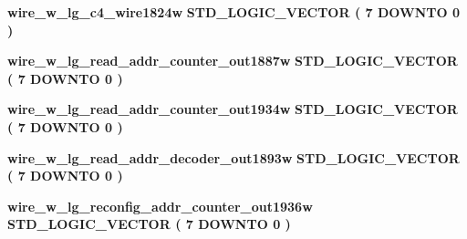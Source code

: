 \begin{DoxyCompactItemize}
\item 
{\bf wire\+\_\+w\+\_\+lg\+\_\+c4\+\_\+wire1824w} {\bfseries \textcolor{comment}{S\+T\+D\+\_\+\+L\+O\+G\+I\+C\+\_\+\+V\+E\+C\+T\+OR}\textcolor{vhdlchar}{ }\textcolor{vhdlchar}{(}\textcolor{vhdlchar}{ }\textcolor{vhdlchar}{ } \textcolor{vhdldigit}{7} \textcolor{vhdlchar}{ }\textcolor{keywordflow}{D\+O\+W\+N\+TO}\textcolor{vhdlchar}{ }\textcolor{vhdlchar}{ } \textcolor{vhdldigit}{0} \textcolor{vhdlchar}{ }\textcolor{vhdlchar}{)}\textcolor{vhdlchar}{ }} 
\item 
{\bf wire\+\_\+w\+\_\+lg\+\_\+read\+\_\+addr\+\_\+counter\+\_\+out1887w} {\bfseries \textcolor{comment}{S\+T\+D\+\_\+\+L\+O\+G\+I\+C\+\_\+\+V\+E\+C\+T\+OR}\textcolor{vhdlchar}{ }\textcolor{vhdlchar}{(}\textcolor{vhdlchar}{ }\textcolor{vhdlchar}{ } \textcolor{vhdldigit}{7} \textcolor{vhdlchar}{ }\textcolor{keywordflow}{D\+O\+W\+N\+TO}\textcolor{vhdlchar}{ }\textcolor{vhdlchar}{ } \textcolor{vhdldigit}{0} \textcolor{vhdlchar}{ }\textcolor{vhdlchar}{)}\textcolor{vhdlchar}{ }} 
\item 
{\bf wire\+\_\+w\+\_\+lg\+\_\+read\+\_\+addr\+\_\+counter\+\_\+out1934w} {\bfseries \textcolor{comment}{S\+T\+D\+\_\+\+L\+O\+G\+I\+C\+\_\+\+V\+E\+C\+T\+OR}\textcolor{vhdlchar}{ }\textcolor{vhdlchar}{(}\textcolor{vhdlchar}{ }\textcolor{vhdlchar}{ } \textcolor{vhdldigit}{7} \textcolor{vhdlchar}{ }\textcolor{keywordflow}{D\+O\+W\+N\+TO}\textcolor{vhdlchar}{ }\textcolor{vhdlchar}{ } \textcolor{vhdldigit}{0} \textcolor{vhdlchar}{ }\textcolor{vhdlchar}{)}\textcolor{vhdlchar}{ }} 
\item 
{\bf wire\+\_\+w\+\_\+lg\+\_\+read\+\_\+addr\+\_\+decoder\+\_\+out1893w} {\bfseries \textcolor{comment}{S\+T\+D\+\_\+\+L\+O\+G\+I\+C\+\_\+\+V\+E\+C\+T\+OR}\textcolor{vhdlchar}{ }\textcolor{vhdlchar}{(}\textcolor{vhdlchar}{ }\textcolor{vhdlchar}{ } \textcolor{vhdldigit}{7} \textcolor{vhdlchar}{ }\textcolor{keywordflow}{D\+O\+W\+N\+TO}\textcolor{vhdlchar}{ }\textcolor{vhdlchar}{ } \textcolor{vhdldigit}{0} \textcolor{vhdlchar}{ }\textcolor{vhdlchar}{)}\textcolor{vhdlchar}{ }} 
\item 
{\bf wire\+\_\+w\+\_\+lg\+\_\+reconfig\+\_\+addr\+\_\+counter\+\_\+out1936w} {\bfseries \textcolor{comment}{S\+T\+D\+\_\+\+L\+O\+G\+I\+C\+\_\+\+V\+E\+C\+T\+OR}\textcolor{vhdlchar}{ }\textcolor{vhdlchar}{(}\textcolor{vhdlchar}{ }\textcolor{vhdlchar}{ } \textcolor{vhdldigit}{7} \textcolor{vhdlchar}{ }\textcolor{keywordflow}{D\+O\+W\+N\+TO}\textcolor{vhdlchar}{ }\textcolor{vhdlchar}{ } \textcolor{vhdldigit}{0} \textcolor{vhdlchar}{ }\textcolor{vhdlchar}{)}\textcolor{vhdlchar}{ }} 

\end{DoxyCompactItemize}
